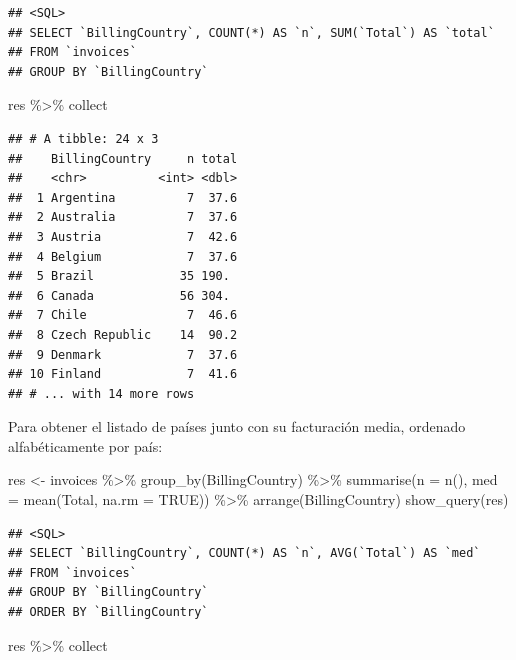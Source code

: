 \documentclass[
]{book}
\newenvironment{Shaded}{\begin{snugshade}}{\end{snugshade}}
\newcommand{\AttributeTok}[1]{\textcolor[rgb]{0.77,0.63,0.00}{#1}}
\newcommand{\ConstantTok}[1]{\textcolor[rgb]{0.00,0.00,0.00}{#1}}
\newcommand{\FunctionTok}[1]{\textcolor[rgb]{0.00,0.00,0.00}{#1}}
\newcommand{\NormalTok}[1]{#1}
\newcommand{\OtherTok}[1]{\textcolor[rgb]{0.56,0.35,0.01}{#1}}
\newcommand{\SpecialCharTok}[1]{\textcolor[rgb]{0.00,0.00,0.00}{#1}}
\theoremstyle{break}
\theoremstyle{nonumberplain}
\begin{document}
\begin{verbatim}
## <SQL>
## SELECT `BillingCountry`, COUNT(*) AS `n`, SUM(`Total`) AS `total`
## FROM `invoices`
## GROUP BY `BillingCountry`
\end{verbatim}

\begin{Shaded}
\begin{Highlighting}[]
\NormalTok{res  }\SpecialCharTok{\%\textgreater{}\%}\NormalTok{ collect}
\end{Highlighting}
\end{Shaded}

\begin{verbatim}
## # A tibble: 24 x 3
##    BillingCountry     n total
##    <chr>          <int> <dbl>
##  1 Argentina          7  37.6
##  2 Australia          7  37.6
##  3 Austria            7  42.6
##  4 Belgium            7  37.6
##  5 Brazil            35 190. 
##  6 Canada            56 304. 
##  7 Chile              7  46.6
##  8 Czech Republic    14  90.2
##  9 Denmark            7  37.6
## 10 Finland            7  41.6
## # ... with 14 more rows
\end{verbatim}

Para obtener el listado de países junto con su facturación media, ordenado alfabéticamente por país:

\begin{Shaded}
\begin{Highlighting}[]
\NormalTok{res }\OtherTok{\textless{}{-}}\NormalTok{ invoices }\SpecialCharTok{\%\textgreater{}\%} \FunctionTok{group\_by}\NormalTok{(BillingCountry) }\SpecialCharTok{\%\textgreater{}\%} 
          \FunctionTok{summarise}\NormalTok{(}\AttributeTok{n =} \FunctionTok{n}\NormalTok{(), }\AttributeTok{med =} \FunctionTok{mean}\NormalTok{(Total, }\AttributeTok{na.rm =} \ConstantTok{TRUE}\NormalTok{)) }\SpecialCharTok{\%\textgreater{}\%}
          \FunctionTok{arrange}\NormalTok{(BillingCountry)}
\FunctionTok{show\_query}\NormalTok{(res)}
\end{Highlighting}
\end{Shaded}

\begin{verbatim}
## <SQL>
## SELECT `BillingCountry`, COUNT(*) AS `n`, AVG(`Total`) AS `med`
## FROM `invoices`
## GROUP BY `BillingCountry`
## ORDER BY `BillingCountry`
\end{verbatim}

\begin{Shaded}
\begin{Highlighting}[]
\NormalTok{res  }\SpecialCharTok{\%\textgreater{}\%}\NormalTok{ collect}
\end{Highlighting}
\end{Shaded}
\end{document}
